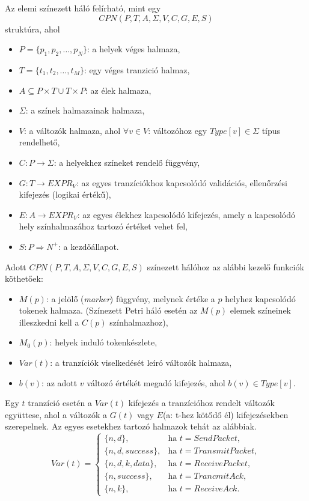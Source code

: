 Az elemi színezett háló felírható, mint egy
\[
CPN(P, T, A, \Sigma, V, C, G, E, S)
\]
struktúra, ahol 
\begin{itemize}
\item $P=\{ p_1, p_2, \ldots, p_N \}$: a helyek véges halmaza,
\item $T=\{ t_1, t_2, \ldots, t_M\}$: egy véges tranzició halmaz,
\item $A \subseteq P\times T \cup T \times P$: az élek halmaza,
\item $\Sigma$: a színek halmazainak halmaza, 
\item $V$: a változók halmaza, ahol $\forall v\in V$: változóhoz egy $Type[v] \in \Sigma $ típus rendelhető,
\item $C: P\rightarrow \Sigma$: a helyekhez színeket rendelő függvény,
\item $G: T\rightarrow EXPR_V$: az egyes tranzíciókhoz kapcsolódó validációs, ellenőrzési kifejezés (logikai értékű),
\item $E: A\rightarrow EXPR_V$: az egyes élekhez kapcsolódó kifejezés, amely a kapcsolódó hely színhalmazához tartozó értéket vehet fel,
\item $S: P\Rightarrow N^+$: a kezdőállapot.
\end{itemize}

Adott $CPN(P, T, A, \Sigma, V, C, G, E, S)$ színezett hálóhoz az alábbi kezelő funkciók köthetőek: 
\begin{itemize}
\item $M(p)$: a jelölő (\textit{marker}) függvény, melynek értéke a $p$ helyhez kapcsolódó tokenek halmaza. (Színezett Petri háló esetén az $M(p)$ elemek színeinek illeszkedni kell a $C(p)$ színhalmazhoz),
\item $M_0(p)$: helyek induló tokenkészlete,
\item $Var(t)$: a tranzíciók viselkedését leíró változók halmaza,
\item $b(v)$: az adott $v$ változó értékét megadó kifejezés, ahol $b(v) \in Type[v]$.
\end{itemize}

Egy $t$ tranzíció esetén a $Var(t)$ kifejezés a tranzícióhoz rendelt változók együttese, ahol a változók a $G(t)$ vagy $E$(a: t-hez kötődő él) kifejezésekben szerepelnek.
Az egyes esetekhez tartozó halmazok tehát az alábbiak.
\begin{equation*}
Var(t)=\begin{cases}
\{n,d\}, &\text{ha } t=SendPacket, \\
\{n,d,success\}, &\text{ha } t= TransmitPacket, \\
\{n,d,k,data\}, &\text{ha } t=ReceivePacket, \\
\{n,success\}, &\text{ha } t=TrancmitAck, \\
\{n,k\}, &\text{ha }t=ReceiveAck.
\end{cases}
\end{equation*}

